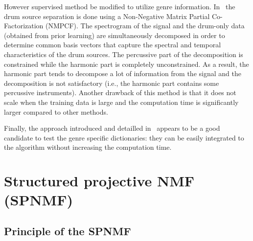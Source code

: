 \documentclass{article}
\begin{document}
However supervised method be modified to utilize genre information. In~\cite{kim2011nonnegative} the drum source separation is done using a Non-Negative Matrix Partial Co-Factorization (NMPCF). The spectrogram of the signal and the drum-only data (obtained from prior learning) are simultaneously decomposed in order to determine common basis vectors that capture the spectral and temporal characteristics of the drum sources. The percussive part of the decomposition is constrained while the harmonic part is completely unconstrained. As a result, the harmonic part 
tends to decompose a lot of information from the signal and the decomposition is not satisfactory (i.e., the harmonic part contains some percussive instruments). Another drawback of this method is that it does not scale when the training data is large and the computation time is significantly larger compared to other methods.


Finally, the approach introduced and detailled in~\cite{laroche2015structuredhidden,larocheJournalhidden} appears to be a good candidate to test the genre specific dictionaries: they can be easily integrated to the algorithm without increasing the computation time. %



\section{Structured projective NMF (SPNMF)}
\label{sec:SPNMF}


\subsection{Principle of the SPNMF}
\end{document}
